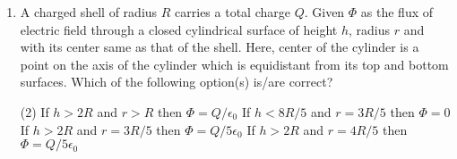 
\begin{enumerate}
    \item A charged shell of radius \( R \) carries a total charge \( Q \). Given \( \Phi \) as the flux of electric field through a closed cylindrical surface of height \( h \), radius \( r \) and with its center same as that of the shell. Here, center of the cylinder is a point on the axis of the cylinder which is equidistant from its top and bottom surfaces. Which of the following option(s) is/are correct? 
    \begin{tasks}(2)
        \task If \( h > 2R \) and \( r > R \) then \( \Phi = Q/\epsilon_0 \)
        \task If \( h < 8R/5 \) and \( r = 3R/5 \) then \( \Phi = 0 \)
        \task If \( h > 2R \) and \( r = 3R/5 \) then \( \Phi = Q/5\epsilon_0 \)
        \task If \( h > 2R \) and \( r = 4R/5 \) then \( \Phi = Q/5\epsilon_0 \)
    \end{tasks}
\end{enumerate}
